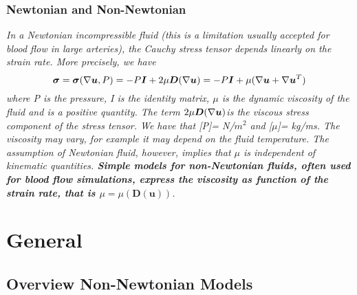 \documentclass[11pt,letterpaper]{article}
\begin{document}
\subsubsection*{Newtonian and Non-Newtonian}
\textit{ In a Newtonian incompressible fluid (this is a limitation usually accepted for blood flow in large arteries), the Cauchy stress tensor depends
linearly on the strain rate. More precisely, we have \begin{equation}
    \bm{\sigma} = \bm{\sigma}(\nabla\bm{u},P)= -P\bm{I} +2\mu\bm{D}(\nabla\bm{u})= -P\bm{I} + \mu(\nabla\bm{u}+\nabla\bm{u}^T)
\end{equation}
where P is the pressure, I is the identity matrix, $\mu$ is the dynamic viscosity of the fluid and is a positive quantity. The term $2\mu\bm{D}(\nabla\bm{u})$is the viscous stress component of the stress tensor. We
have that [P]= N/$m^2$ and [$\mu$]= kg/ms. The viscosity may vary, for example it may depend on the fluid temperature. The assumption of Newtonian fluid, however, implies that $\mu$ is independent of kinematic quantities. \textbf{Simple models for non-Newtonian fluids, often used for blood flow simulations, express the viscosity as function of the strain rate, that is $\mu = \mu(\bm{D}(\bm{u}))$}. }

\newpage
\section{General}

\subsection*{Overview Non-Newtonian Models
}


\newpage
\end{document}
